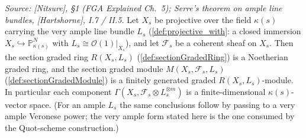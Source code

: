 \begin{lemma}
  \label{lem:sectionGradedModule_fg}
  \leanok
  \textit{Source: [Nitsure], \S 1 (FGA Explained Ch.~5); Serre's theorem on
  ample line bundles, [Hartshorne], I.7 / II.5.}
  Let \(X_s\) be projective over the field \(\kappa(s)\) carrying the very
  ample line bundle \(L_s\) (\cref{def:projective_with}: a closed immersion
  \(X_s \hookrightarrow \mathbb{P}^N_{\kappa(s)}\) with
  \(L_s \cong \mathcal{O}(1)|_{X_s}\)), and let \(\mathcal{F}_s\) be a
  coherent sheaf on \(X_s\).
  Then the section graded ring \(R(X_s, L_s)\) (\cref{def:sectionGradedRing}) is a
  Noetherian graded ring, and the section graded module
  \(M(X_s, \mathcal{F}_s, L_s)\) (\cref{def:sectionGradedModule}) is a finitely
  generated graded \(R(X_s, L_s)\)-module. In particular each component
  \(\Gamma(X_s, \mathcal{F}_s \otimes L_s^{\otimes m})\) is a finite-dimensional
  \(\kappa(s)\)-vector space.
  (For an ample \(L_s\) the same conclusions follow by passing to a very
  ample Veronese power; the very ample form stated here is the one consumed
  by the Quot-scheme construction.)
\end{lemma}

